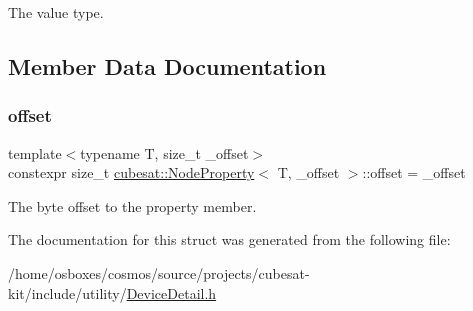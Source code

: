 The value type. 



\subsection{Member Data Documentation}
\mbox{\label{structcubesat_1_1NodeProperty_a028759af3a77611ebdcbd3e4f352bfa0}} 
\subsubsection{\texorpdfstring{offset}{offset}}
{\footnotesize\ttfamily template$<$typename T, size\+\_\+t \+\_\+offset$>$ \\
constexpr size\+\_\+t \hyperlink{structcubesat_1_1NodeProperty}{cubesat\+::\+Node\+Property}$<$ T, \+\_\+offset $>$\+::offset = \+\_\+offset\hspace{0.3cm}{\ttfamily [static]}}



The byte offset to the property member. 



The documentation for this struct was generated from the following file\+:\begin{DoxyCompactItemize}
\item 
/home/osboxes/cosmos/source/projects/cubesat-\/kit/include/utility/\hyperlink{DeviceDetail_8h}{Device\+Detail.\+h}\end{DoxyCompactItemize}
